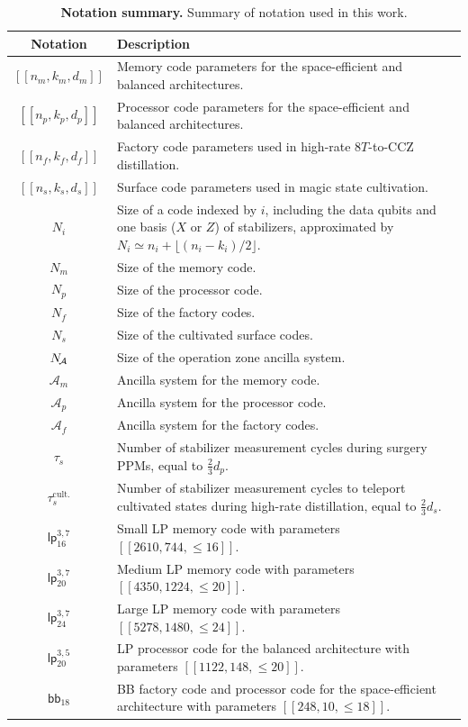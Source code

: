 \documentclass[reprint,twocolumn,secnumarabic,amssymb, aps, prx]{revtex4-2}
\newcommand{\lpmemsmallparams}{\mbox{$[[2610, 744, \leq 16]]$}}
\newcommand{\lpmemmedparams}{\mbox{$[[4350, 1224, \leq 20]]$}}
\newcommand{\lpmemlargeparams}{\mbox{$[[5278, 1480, \leq 24]]$}}
\newcommand{\bbparams}{\mbox{$[[248, 10, \leq 18]]$}}
\newcommand{\lpprocparams}{\mbox{$[[1122, 148, \leq 20]]$}}
\newcommand{\bb}{\mbox{$\mathsf{bb}_{18}$}}
\newcommand{\lpmemlarge}{\mbox{$\mathsf{lp}_{24}^{3, 7}$}}
\newcommand{\lpmemmed}{\mbox{$\mathsf{lp}^{3, 7}_{20}$}}
\newcommand{\lpmemsmall}{\mbox{$\mathsf{lp}^{3, 7}_{16}$}}
\newcommand{\lpproc}{\mbox{$\mathsf{lp}^{3, 5}_{20}$}}
\newcommand{\Nproc}{N_p}
\newcommand{\nproc}{n_p}
\newcommand{\kproc}{k_p}
\newcommand{\dproc}{d_p}
\newcommand{\Aproc}{\mathcal{A}_p}
\newcommand{\Nm}{N_m}
\newcommand{\nm}{n_m}
\newcommand{\km}{k_m}
\newcommand{\dm}{d_m}
\newcommand{\Am}{\mathcal{A}_m}
\newcommand{\Na}{N_{\text{\!}\mathcal{A}}}
\newcommand{\Nf}{N_f}
\newcommand{\nf}{n_f}
\newcommand{\kf}{k_f}
\newcommand{\df}{d_f}
\newcommand{\Af}{\mathcal{A}_f}
\newcommand{\Ns}{N_s}
\newcommand{\ns}{n_s}
\newcommand{\ks}{k_s}
\newcommand{\ds}{d_s}
\newcommand{\taus}{\tau_s}
\newcommand{\tauscult}{\tau_s^{\text{cult.}}}
\begin{document}
\begin{table}[ht!]
\caption{\textbf{Notation summary.} Summary of notation used in this work. \label{tab:notation}}
\begin{ruledtabular}
\begin{tabular}{cp{13.5cm}} 
 Notation & Description \\ \hline
    $[[\nm, \km, \dm]]$ & Memory code parameters for the space-efficient and balanced architectures. \\
    $[[\nproc, \kproc, \dproc]]$ & Processor code parameters for the space-efficient and balanced architectures. \\
    $[[\nf, \kf, \df]]$ & Factory code parameters  used in high-rate 8$T$-to-CCZ distillation. \\
    $[[\ns, \ks, \ds]]$ & Surface code parameters  used in magic state cultivation. \\
  $N_i$ & Size of a code indexed by $i$, including the data qubits and one basis ($X$ or $Z$) of stabilizers, approximated by \mbox{$N_i\simeq n_i + \lfloor (n_i-k_i)/2\rfloor$}. \\
  $\Nm$ & Size of the memory code. \\
  $\Nproc$ & Size of the processor code. \\
  $\Nf$ & Size of the factory codes. \\
  $\Ns$ & Size of the cultivated surface codes. \\
  $\Na$ & Size of the operation zone ancilla system. \\
  $\Am$ & Ancilla system for the memory code. \\
  $\Aproc$ & Ancilla system for the processor code. \\
  $\Af$ & Ancilla system for the factory codes. \\
  $\taus$ & Number of stabilizer measurement cycles during surgery PPMs, equal to $\frac{2}{3}\dproc$. \\
  $\tauscult$ & Number of stabilizer measurement cycles to teleport cultivated  states during high-rate distillation, equal to $\frac{2}{3}\ds$. \\
  \lpmemsmall & Small LP memory code with parameters \lpmemsmallparams. \\
   \lpmemmed & Medium LP memory code with parameters \lpmemmedparams. \\
   \lpmemlarge & Large LP memory code with parameters \lpmemlargeparams. \\
   \lpproc & LP processor code for the balanced architecture with parameters \lpprocparams. \\
   \bb & BB factory code and processor code for the space-efficient architecture with parameters \bbparams. 
\end{tabular}
\end{ruledtabular}
\end{table}
\end{document}
